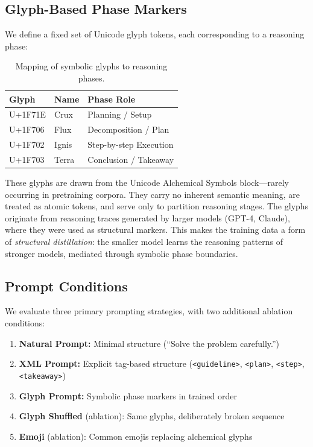 \documentclass[11pt]{article}
\begin{document}
\subsection{Glyph-Based Phase Markers}

We define a fixed set of Unicode glyph tokens, each corresponding to a reasoning phase:

\begin{table}[h]
\centering
\caption{Mapping of symbolic glyphs to reasoning phases.}
\label{tab:glyphs}
\begin{tabular}{@{}lll@{}}
\toprule
\textbf{Glyph} & \textbf{Name} & \textbf{Phase Role} \\
\midrule
\textsf{U+1F71E} & Crux & Planning / Setup \\
\textsf{U+1F706} & Flux & Decomposition / Plan \\
\textsf{U+1F702} & Ignis & Step-by-step Execution \\
\textsf{U+1F703} & Terra & Conclusion / Takeaway \\
\bottomrule
\end{tabular}
\end{table}

These glyphs are drawn from the Unicode Alchemical Symbols block---rarely occurring in pretraining corpora. They carry no inherent semantic meaning, are treated as atomic tokens, and serve only to partition reasoning stages. The glyphs originate from reasoning traces generated by larger models (GPT-4, Claude), where they were used as structural markers. This makes the training data a form of \textit{structural distillation}: the smaller model learns the reasoning patterns of stronger models, mediated through symbolic phase boundaries.

\subsection{Prompt Conditions}

We evaluate three primary prompting strategies, with two additional ablation conditions:

\begin{enumerate}
    \item \textbf{Natural Prompt:} Minimal structure (``Solve the problem carefully.'')
    \item \textbf{XML Prompt:} Explicit tag-based structure (\texttt{<guideline>}, \texttt{<plan>}, \texttt{<step>}, \texttt{<takeaway>})
    \item \textbf{Glyph Prompt:} Symbolic phase markers in trained order
    \item \textbf{Glyph Shuffled} (ablation): Same glyphs, deliberately broken sequence
    \item \textbf{Emoji} (ablation): Common emojis replacing alchemical glyphs
\end{enumerate}
\end{document}
